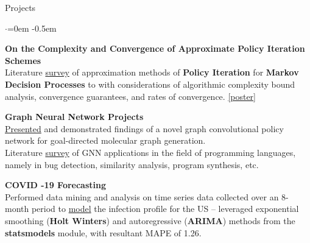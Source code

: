 \documentclass{resume}
\begin{document}
\begin{rSection}{Projects}
    \vspace{0.5em}
    \begin{list}{$\cdot$}{\leftmargin=0em}
      \itemsep -0.5em \vspace{-0.5em}
        \item {\bf On the Complexity and Convergence of Approximate Policy Iteration Schemes}\\
        Literature \href{https://github.com/joostinyi/ECE239AS/blob/master/RL_S20.pdf}{survey} of approximation methods of \textbf{Policy Iteration}
        for \textbf{Markov Decision Processes} to with considerations of algorithmic complexity bound analysis, convergence guarantees, and rates of convergence. 
        \href{https://github.com/joostinyi/ECE239AS/blob/master/Approximate-Policy-Iteration-Poster.pdf}{[poster]}
        \item {\bf Graph Neural Network Projects}\\
        \href{https://github.com/yichousun/Winter2021_CS249_GNN/tree/main/Paper_Presentation/Graph_Synthesis/GCPN}{Presented} and demonstrated findings of a novel graph convolutional policy network for goal-directed molecular graph generation.\\
        Literature \href{https://github.com/Sripathm2/GNNSurvey}{survey} of GNN applications in the field of programming languages, namely in bug detection, similarity analysis, program synthesis, etc.
        \item {\bf COVID -19 Forecasting}\\
        Performed data mining and analysis on time series data collected over an 8-month period to \href{https://github.com/yashlala/cs-145-project}{model} the infection profile
        for the US – leveraged exponential smoothing (\textbf{Holt Winters}) and autoregressive (\textbf{ARIMA}) methods from the \textbf{statsmodels} module, with resultant MAPE of 1.26.    
    \end{list}
    \end{rSection}
\end{document}
